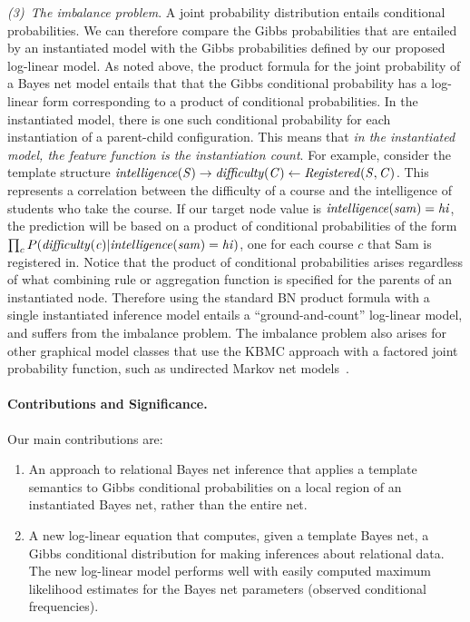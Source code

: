 \documentclass[twoside,11pt]{article}
\newcommand{\point}[1]{\noindent\emph{#1}.}
\newcommand{\strongpoint}[1]{\paragraph{#1.}}
\begin{document}
\point{(3)~The imbalance problem} A joint probability distribution entails conditional probabilities. We can therefore compare the Gibbs probabilities that are entailed by an instantiated model with the Gibbs probabilities defined by our proposed log-linear model.
As noted above, the product formula for the joint probability of a Bayes net model entails that that the Gibbs conditional probability has a log-linear form corresponding to a product of conditional probabilities. In the instantiated model, there is one such conditional probability for each instantiation of a parent-child configuration. This means that {\em in the instantiated model, the feature function is the instantiation count}. For example, consider the template structure $\it{intelligence}(S) \rightarrow \it{difficulty}(C) \leftarrow \it{Registered}(S,C)$. This represents a correlation between the difficulty of a course and the intelligence of students who take the course. If our target node value is $\it{intelligence}(sam) = hi$, the prediction will be based on a product of conditional probabilities of the form $\prod_{c}P(\it{difficulty}(c)|\it{intelligence}(sam) = hi)$, one for each course $c$ that Sam is registered in. 
Notice that the product of conditional probabilities arises regardless of what combining rule or aggregation function is specified for the parents of an instantiated node.
Therefore using the standard BN product formula with a single instantiated inference model entails a ``ground-and-count'' log-linear model, and suffers from the imbalance problem.  The imbalance problem also arises for other graphical model classes that use the KBMC approach with a factored joint probability function, such as undirected Markov net models~\cite{Domingos2009,Taskar2002}. 





\strongpoint{Contributions and Significance} Our main contributions are: 
\begin{enumerate}
\item An approach to relational Bayes net inference that applies a template semantics to Gibbs conditional probabilities on a local region of an instantiated Bayes net, rather than the entire net.
\item A new log-linear equation that computes, given a template Bayes net, a Gibbs conditional distribution for making inferences about relational data. The new log-linear model performs well with easily computed maximum likelihood estimates for the Bayes net parameters (observed conditional frequencies).

\end{enumerate}
\end{document}
